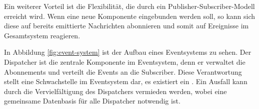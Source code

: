 Ein weiterer Vorteil ist die Flexibilität, die durch ein Publisher-Subscriber-Modell erreicht wird. Wenn eine neue Komponente eingebunden werden soll, so kann sich diese auf bereits emittierte Nachrichten abonnieren und somit auf Ereignisse im Gesamtsystem reagieren.

In Abbildung \ref{fig:event-system} ist der Aufbau eines Eventsystems zu sehen. Der Dispatcher ist die zentrale Komponente im Eventsystem, denn er verwaltet die Abonnements und verteilt die Events an die Subscriber. Diese Verantwortung stellt eine Schwachstelle im Eventsystem dar, es existiert ein . Ein Ausfall kann durch die Vervielfältigung des Dispatchers vermieden werden, wobei eine gemeinsame Datenbasis für alle Dispatcher notwendig ist. 
